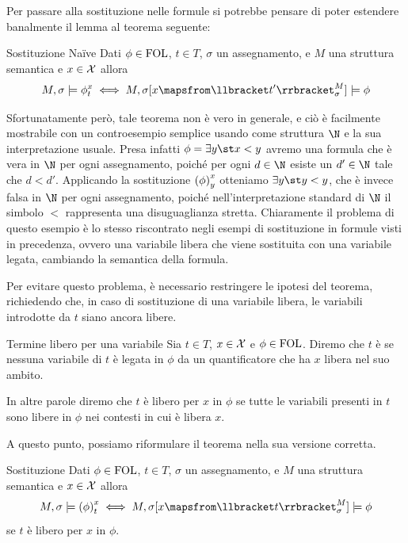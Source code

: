 Per passare alla sostituzione nelle formule si potrebbe pensare di poter estendere banalmente il lemma al teorema seguente:

\begin{theorem}{Sostituzione Naïve}
  Dati \(\phi\in\FOL\), \(t\in T\), \(\sigma\) un assegnamento, e \(M\) una struttura semantica e \(x\in\mathcal{X}\) allora
  \[M,\sigma \models {\phi}^{x}_{t} \iff M,\sigma[x\mapsfrom \den{t'}[M][\sigma]] \models \phi\]
\end{theorem}

Sfortunatamente però, tale teorema non è vero in generale, e ciò è facilmente mostrabile con un controesempio semplice usando come struttura \(\N\) e la sua interpretazione usuale.
Presa infatti \(\phi = \exists y \st x<y\) avremo una formula che è vera in \(\N\) per ogni assegnamento, poiché per ogni \(d\in\N\) esiste un \(d'\in\N\) tale che \(d<d'\). Applicando la sostituzione \({{\left(\phi\right)}^{x}_{y}}\) otteniamo \(\exists y \st y<y\), che è invece falsa in \(\N\) per ogni assegnamento, poiché nell'interpretazione standard di \(\N\) il simbolo \(<\) rappresenta una disuguaglianza stretta. Chiaramente il problema di questo esempio è lo stesso riscontrato negli esempi di sostituzione in formule visti in precedenza, ovvero una variabile libera che viene sostituita con una variabile legata, cambiando la semantica della formula.

Per evitare questo problema, è necessario restringere le ipotesi del teorema, richiedendo che, in caso di sostituzione di una variabile libera, le variabili introdotte da \(t\) siano ancora libere.

\begin{definition}{Termine libero per una variabile}
  Sia \(t\in T\), \(x\in\mathcal{X}\) e \(\phi \in \FOL\). Diremo che \(t\) è  se nessuna variabile di \(t\) è legata in \(\phi\) da un quantificatore che ha \(x\) libera nel suo ambito.
\end{definition}

In altre parole diremo che \(t\) è libero per \(x\) in \(\phi\) se tutte le variabili presenti in \(t\) sono libere in \(\phi\) nei contesti in cui è libera \(x\).

A questo punto, possiamo riformulare il teorema nella sua versione corretta.

\begin{theorem}[namedlabel={thm:fol_substitution}{Sostituzione}]{Sostituzione}
  Dati \(\phi\in\FOL\), \(t\in T\), \(\sigma\) un assegnamento, e \(M\) una struttura semantica e \(x\in\mathcal{X}\) allora
  \[M,\sigma \models \subs{\phi}{x}{t} \iff M,\sigma[x\mapsfrom \den{t}[M][\sigma]] \models \phi\]
  se \(t\) è libero per \(x\) in \(\phi\).
\end{theorem}

